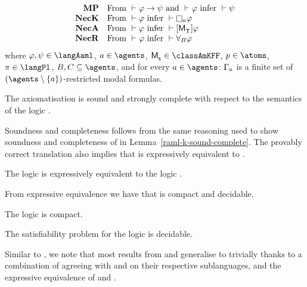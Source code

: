 \begin{definition}
$$\begin{array}{rl}
    {\bf MP}    & \text{From } \proves \phi \implies \psi \text{ and } \proves \phi \text{ infer } \proves \psi\\
    {\bf NecK}  & \text{From } \proves \phi \text{ infer } \proves \necessaryA \phi\\
    {\bf NecA} & \text{From } \proves \phi \text{ infer } \proves \actionA{\aPModel{\aStatesT}} \phi\\
    {\bf NecR} & \text{From } \proves \phi \text{ infer } \proves \allrefsBs \phi
\end{array}
$$
where $\phi, \psi \in \langAaml$, $\agentA \in \agents$, $\aPModel{\aStateS} \in \classAmKFF$, $\atomP \in \atoms$, $\pi \in \langPl$, $\agentsB, \agentsC \subseteq \agents$, and for every $\agentA \in \agents$: $\Gamma_a$ is a finite set of $(\agents \setminus \{\agentA\})$-restricted modal formulas.
\end{definition}

\begin{lemma}\label{raml-k45-sound-complete}
The axiomatisation \axiomRamlKFF{} is sound and strongly complete with respect to the semantics of the logic \logicRamlKFF{}.
\end{lemma}

Soundness and completeness follows from the same reasoning used to show soundness and completeness of \axiomRamlK{} in Lemma~\ref{raml-k-sound-complete}.
The provably correct translation also implies that \logicRamlKFF{} is expressively equivalent to \logicKFF{}.

\begin{corollary}\label{raml-k45-expressive-equivalence}
The logic \logicRamlKFF{} is expressively equivalent to the logic \logicKFF{}.
\end{corollary}

From expressive equivalence we have that \logicRmlKFF{} is compact and decidable.

\begin{corollary}
The logic \logicRamlKFF{} is compact.
\end{corollary}

\begin{corollary}
The satisfiability problem for the logic \logicRamlKFF{} is decidable.
\end{corollary}

Similar to \logicRamlK{}, we note that most results from \logicAmlKFF{} and \logicRmlKFF{} generalise to \logicRamlKFF{} trivially thanks to a combination of \logicRamlKFF{} agreeing with \logicAmlKFF{} and \logicRmlKFF{} on their respective sublanguages, and the expressive equivalence of \logicRamlKFF{} and \logicKFF{}.

